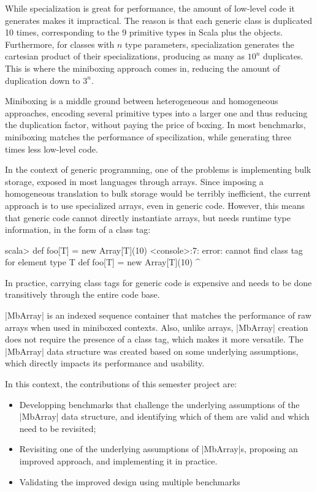 While specialization is great for performance, the amount of low-level code it generates makes it impractical. The reason is that each generic class is duplicated 10 times, corresponding to the 9 primitive types in Scala plus the objects. Furthermore, for classes with $n$ type parameters, specialization generates the cartesian product of their specializations, producing as many as $10^n$ duplicates. This is where the miniboxing approach comes in, reducing the amount of duplication down to $3^n$.

Miniboxing is a middle ground between heterogeneous and homogeneous approaches, encoding several primitive types into a larger one and thus reducing the duplication factor, without paying the price of boxing. In most benchmarks, miniboxing matches the performance of specilization, while generating three times less low-level code.


In the context of generic programming, one of the problems is implementing bulk storage, exposed in most languages through arrays. Since imposing a homogeneous translation to bulk storage would be terribly inefficient, the current approach is to use specialized arrays, even in generic code. However, this means that generic code cannot directly instantiate arrays, but needs runtime type information, in the form of a class tag:

\begin{lstlisting-nobreak}
scala>  def foo[T] = new Array[T](10)
<console>:7: error: cannot find class tag for element type T
        def foo[T] = new Array[T](10)
                     ^
\end{lstlisting-nobreak}

\noindent In practice, carrying class tags for generic code is expensive and needs to be done transitively through the entire code base.

|MbArray| is an indexed sequence container that matches the performance of raw arrays when used in miniboxed contexts. Also, unlike arrays, |MbArray| creation does not require the presence of a class tag, which makes it more versatile. The |MbArray| data structure was created based on some underlying assumptions, which directly impacts its performance and usability.

In this context, the contributions of this semester project are:
\begin{itemize}
  \item Developping benchmarks that challenge the underlying assumptions of the |MbArray| data structure, and identifying which of them are valid and which need to be revisited;
  \item Revisiting one of the underlying assumptions of |MbArray|s, proposing an improved approach, and implementing it in practice.
  \item Validating the improved design using multiple benchmarks
\end{itemize}



% 



